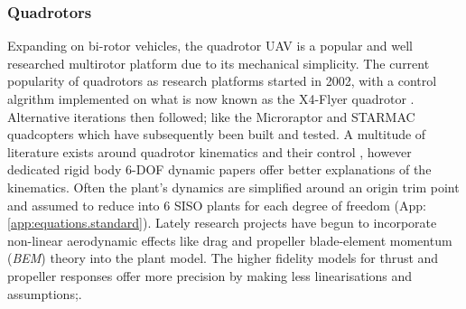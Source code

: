 \subsubsection*{Quadrotors}
Expanding on bi-rotor vehicles, the quadrotor UAV is a popular and well researched multirotor platform due to its mechanical simplicity. The current popularity of quadrotors as research platforms started in 2002, with a control algrithm implemented on what is now known as the X4-Flyer quadrotor \cite{x4flyer,x4flyercontrol}. Alternative iterations then followed; like the Microraptor\cite{microraptor} and STARMAC\cite{starmac} quadcopters which have subsequently been built and tested. A multitude of literature exists around quadrotor kinematics and their control \cite{dynamicmodelling2013, dynamicmodelling2009, modelingquadcopter, quaddynamics, fullquadcoptercontrol}, however dedicated rigid body 6-DOF dynamic papers \cite{rigidbodylecture,eulerrigidbody} offer better explanations of the kinematics. Often the plant's dynamics are simplified around an origin trim point and assumed to reduce into 6 SISO plants for each degree of freedom (App:\ref{app:equations.standard}). Lately research projects have begun to incorporate non-linear aerodynamic effects like drag and propeller blade-element momentum (\emph{BEM}) theory into the plant model\cite{lowreynolds,bem,starmac}. The higher fidelity models for thrust and propeller responses offer more precision by making less linearisations and assumptions;\cite{nonlineardynamics,starmac}.
\par

